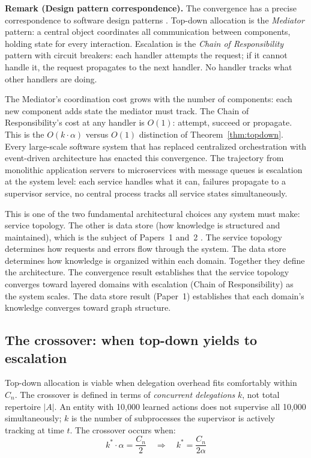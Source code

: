 \documentclass[11pt]{article}
\theoremstyle{definition}
\begin{document}
\textbf{Remark (Design pattern correspondence).}
The convergence has a precise correspondence to software design
patterns \cite{GammaEtAl1994}. Top-down allocation is the
\emph{Mediator} pattern: a central object coordinates all communication
between components, holding state for every interaction. Escalation is
the \emph{Chain of Responsibility} pattern with circuit breakers: each
handler attempts the request; if it cannot handle it, the request
propagates to the next handler. No handler tracks what other handlers
are doing.

The Mediator's coordination cost grows with the number of components:
each new component adds state the mediator must track. The Chain of
Responsibility's cost at any handler is $O(1)$: attempt, succeed or
propagate. This is the $O(k \cdot \alpha)$ versus $O(1)$ distinction
of Theorem~\ref{thm:topdown}. Every large-scale software system that
has replaced centralized orchestration with event-driven architecture
has enacted this convergence. The trajectory from monolithic
application servers to microservices with message queues is
escalation at the system level: each service handles what it can,
failures propagate to a supervisor service, no central process tracks
all service states simultaneously.

This is one of the two fundamental architectural choices any system
must make: service topology. The other is data store (how knowledge is
structured and maintained), which is the subject of Papers~1 and~2
\cite{McCarthy2026a,McCarthy2026b}. The service topology determines
how requests and errors flow through the system. The data store
determines how knowledge is organized within each domain. Together
they define the architecture. The convergence result establishes that
the service topology converges toward layered domains with
escalation (Chain of Responsibility) as the system scales. The data
store result (Paper~1) establishes that each domain's knowledge
converges toward graph structure.

\subsection{The crossover: when top-down yields to escalation}
\label{sec:crossover}

Top-down allocation is viable when delegation overhead fits comfortably
within $C_n$. The crossover is defined in terms of \emph{concurrent
delegations} $k$, not total repertoire $|A|$. An entity with
10{,}000 learned actions does not supervise all 10{,}000
simultaneously; $k$ is the number of subprocesses the supervisor is
actively tracking at time $t$. The crossover occurs when:
\[
k^* \cdot \alpha = \frac{C_n}{2}
\quad\Longrightarrow\quad
k^* = \frac{C_n}{2\alpha}
\]
\end{document}
